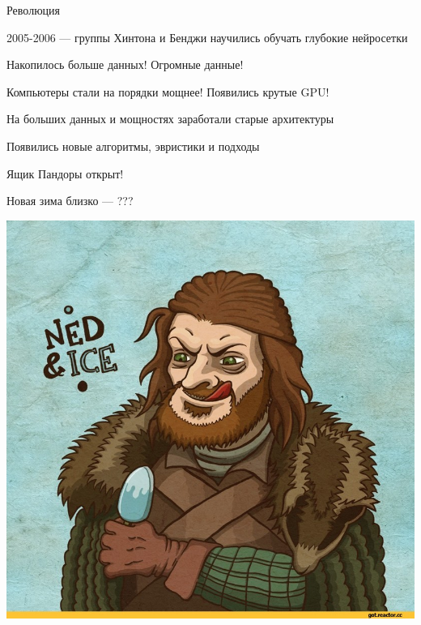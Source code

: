 \documentclass[notes,12pt, aspectratio=169]{beamer}
\newenvironment{wideitemize}{\itemize\addtolength{\itemsep}{10pt}}{\enditemize}
\begin{document}
\begin{frame}{Революция}
	\begin{wideitemize} 
		\item 2005-2006 — группы Хинтона и Бенджи научились обучать глубокие нейросетки
		
		\item Накопилось больше данных! Огромные данные! 
		
		\item Компьютеры стали на порядки мощнее! Появились крутые GPU! 
		
		\item На больших данных и мощностях заработали старые архитектуры
		
		\item Появились новые алгоритмы, эвристики и подходы
		
		\item Ящик Пандоры открыт! 
	\end{wideitemize} 
\end{frame}


{
\begin{frame}
\end{frame}
}


\begin{frame}{Новая зима близко  — ??? }
	\begin{center}
		\includegraphics[width=.6\linewidth]{stark_3.jpeg}
	\end{center}
\end{frame}
\end{document}
